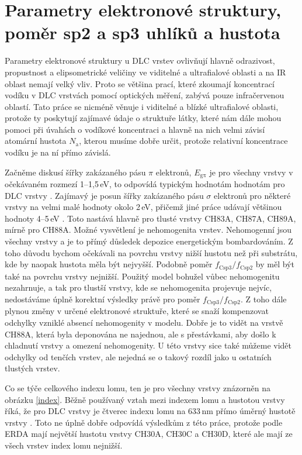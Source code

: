 \section{Parametry elektronové struktury, poměr sp2 a sp3 uhlíků a hustota}
Parametry elektronové struktury u DLC vrstev ovlivňují hlavně odrazivost, propustnost a elipsometrické veličiny ve viditelné a ultrafialové oblasti a na IR oblast nemají velký vliv. 
Proto se většina prací, které zkoumají koncentrací vodíku v DLC vrstvách pomocí optických měření, zabývá pouze infračervenou oblastí. Tato práce se nicméně věnuje i viditelné a blízké ultrafialové oblasti, protože ty poskytují zajímavé údaje o struktuře látky, které nám dále mohou pomoci při úvahách o vodíkové koncentraci a hlavně na nich velmi závisí atomární hustota $N_\mathrm{a}$, kterou musíme dobře určit, protože relativní koncentrace vodíku je na ní přímo závislá.  

Začněme diskusí šířky zakázaného pásu $\pi$ elektronů, $E_\mathrm{g\pi}$ je pro všechny vrstvy v očekávaném rozmezí 1--1,5\,eV, to odpovídá typickým hodnotám hodnotám pro DLC vrstvy \cite{Demichelis1992, Franta2007}. 
Zajímavý je posun šířky zakázaného pásu $\sigma$ elektronů pro některé vrstvy na velmi malé hodnoty okolo 2\,eV, přičemž jiné práce udávají většinou hodnoty 4--5\,eV \cite{Demichelis1992, Franta2011}. Toto nastává hlavně pro tlusté vrstvy CH83A, CH87A, CH89A, mírně pro CH88A. Možné vysvětlení je nehomogenita vrstev. Nehomogenní jsou všechny vrstvy a je to přímý důsledek depozice energetickým bombardováním. 
Z toho důvodu bychom očekávali na povrchu vrstvy nižší hustotu než při substrátu, kde by naopak hustota měla být nejvyšší. Podobně poměr $f_\mathrm{Csp3}/f_\mathrm{Csp2}$ by měl být také na povrchu vrstvy nejnižší. Použitý model bohužel vůbec nehomogenitu nezahrnuje, a tak pro tlustší vrstvy, kde se nehomogenita projevuje nejvíc, nedostáváme úplně korektní výsledky právě pro poměr $f_\mathrm{Csp3}/f_\mathrm{Csp2}$. Z toho dále plynou změny v určené elektronové struktuře, které se snaží kompenzovat odchylky vzniklé absencí nehomogenity v modelu. Dobře je to vidět na vrstvě CH88A, která byla deponována ne najednou, ale s přestávkami, aby došlo k chladnutí vrstvy a omezení nehomogenity. U této vrstvy sice také můžeme vidět odchylky od tenčích vrstev, ale nejedná se o takový rozdíl jako u ostatních tlustých vrstev.

Co se týče celkového indexu lomu, ten je pro všechny vrstvy znázorněn na obrázku \ref{index}. Běžně používaný vztah mezi indexem lomu a hustotou vrstvy říká, že pro DLC vrstvy je čtverec indexu lomu na 633\,nm přímo úměrný hustotě vrstvy \cite{Donnet2008}. Toto ne úplně dobře odpovídá výsledkům z této práce, protože podle ERDA mají největší hustotu vrstvy CH30A, CH30C a CH30D, které ale mají ze všech vrstev index lomu nejnižší. 


